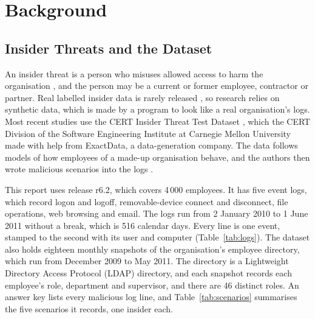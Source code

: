 \documentclass[a4paper,12pt]{article}
\begin{document}
\section{Background}
\label{sec:background}

\subsection{Insider Threats and the Dataset}
An insider threat is a person who misuses allowed access to harm the organisation \cite{Cappelli2012}, and the person may be a current or former employee, contractor or partner. Real labelled insider data is rarely released \cite{Homoliak2019}, so research relies on synthetic data, which is made by a program to look like a real organisation's logs. Most recent studies use the CERT Insider Threat Test Dataset \cite{Lindauer2020,YuanWu2021}, which the CERT Division of the Software Engineering Institute at Carnegie Mellon University made with help from ExactData, a data-generation company. The data follows models of how employees of a made-up organisation behave, and the authors then wrote malicious scenarios into the logs \cite{Glasser2013}.

This report uses release r6.2, which covers 4\,000 employees. It has five event logs, which record logon and logoff, removable-device connect and disconnect, file operations, web browsing and email. The logs run from 2 January 2010 to 1 June 2011 without a break, which is 516 calendar days. Every line is one event, stamped to the second with its user and computer (Table~\ref{tab:logs}). The dataset also holds eighteen monthly snapshots of the organisation's employee directory, which run from December 2009 to May 2011. The directory is a Lightweight Directory Access Protocol (LDAP) directory, and each snapshot records each employee's role, department and supervisor, and there are 46 distinct roles. An answer key lists every malicious log line, and Table~\ref{tab:scenarios} summarises the five scenarios it records, one insider each.
\end{document}
